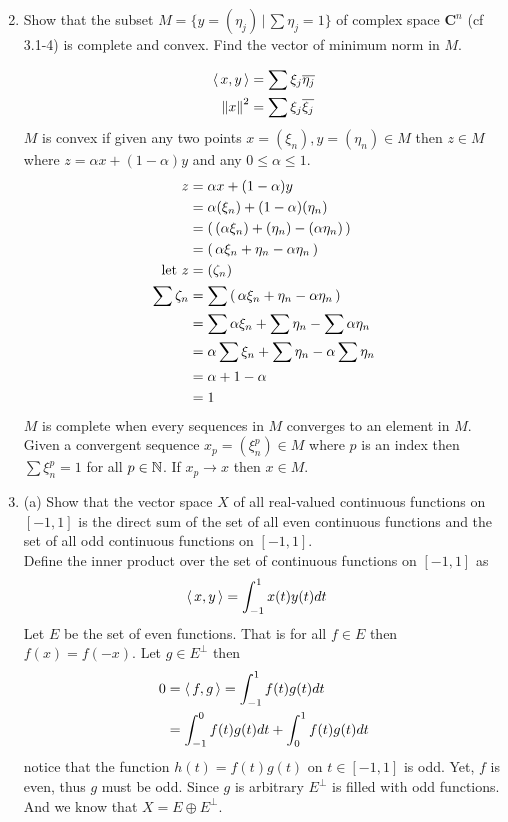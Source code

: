 \documentclass[10pt,a4paper]{report}
\newcommand{\NORM}[1]{\,\left \Vert #1 \right \Vert}
\begin{document}
\begin{enumerate}
	\setcounter{enumi}{1}
	\item Show that the subset $M = \{y =(\eta_j)\,|\, \sum \eta_j = 1\}$ of complex space $\textbf{C}^n$ (cf 3.1-4) is complete and convex.  Find the vector of minimum norm in $M$.
	
	\begin{align*}
		\ABRACKET{x,y} &= \sum \xi_j \CONJ{\eta_j}\\
		\NORM{x}^2 &= \sum \xi_j \CONJ{\xi_j}
	\end{align*}
	$M$ is convex if given any two points $x=(\xi_n),y=(\eta_n) \in M$ then $z\in M$ where $z=\alpha x+(1-\alpha)y$ and any $0\le \alpha \le 1$.
	\begin{align*}
		z&=\alpha x+(1-\alpha)y \\
		&=\alpha (\xi_n)+(1-\alpha) (\eta_n) \\
		&=\left (\,  (\alpha \xi_n) + (\eta_n) -(\alpha \eta_n) \,\right )\\
		&= \left (\,  \alpha \xi_n + \eta_n - \alpha \eta_n \,\right ) \\	
		\text{let } z &= ( \zeta_n )\\
		\sum \zeta_n & = \sum \left (\,  \alpha \xi_n + \eta_n - \alpha \eta_n  \,\right )\\
		&= \sum \alpha \xi_n + \sum \eta_n - \sum \alpha \eta_n \\
		&= \alpha \sum \xi_n + \sum \eta_n - \alpha \sum \eta_n \\
		&= \alpha +1 - \alpha \\
		&= 1
	\end{align*}	$M$ is complete when every sequences in $M$ converges to an element in $M$.\\
	Given a convergent sequence $x_p = ( \xi^p_n) \in M$ where $p$ is an index then $\sum \xi^p_n=1$ for all $p\in \mathbb{N}$.  If $x_p \to x$ then $x \in M$.
	\\
	
	\item (a) Show that the vector space $X$ of all real-valued continuous functions on $[-1,1]$ is the direct sum of the set of all even continuous functions and the set of all odd continuous functions on $[-1,1]$.\\
	
	Define the inner product over the set of continuous functions on $[-1,1]$ as 
	\begin{align*}
		\left \langle\, x,y \,\right \rangle &= \int_{-1}^1 x(t)y(t) dt 
	\end{align*}Let $E$ be the set of even functions.  That is for all $f \in E$ then $f(x) = f(-x)$. Let $g \in E^\perp$ then
	\begin{align*}
		0 &= \left \langle\, f,g \,\right \rangle = \int_{-1}^1 f(t)g(t) dt\\
		&= \int_{-1}^0 f(t) g(t) dt + \int_{0}^1 f(t)g(t) dt\\
	\end{align*}notice that the function $h(t)=f(t)g(t)$ on $t\in[-1,1]$ is odd.  Yet, $f$ is even, thus $g$ must be odd.  Since $g$ is arbitrary $E^\perp$ is filled with odd functions. And we know that $X = E \oplus E^\perp$.
	

\end{enumerate}
\end{document}
